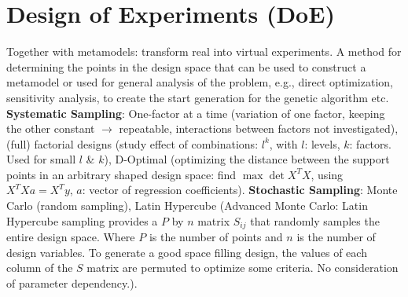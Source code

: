 \section*{Design of Experiments (DoE)}
Together with metamodels: transform real into virtual experiments.
A method for determining the points in the design space that can be used to construct a metamodel or used for general analysis of the problem, e.g., direct optimization, sensitivity analysis, to create the start
generation for the genetic algorithm etc.
\textbf{Systematic Sampling}: One-factor at a time (variation of one factor, keeping the other constant $\rightarrow$ repeatable, interactions between factors not investigated), (full) factorial designs (study effect of combinations: $l^k$, with $l$: levels, $k$: factors. Used for small $l$ \& $k$), D-Optimal (optimizing the distance between the support points in an arbitrary shaped design space: find $\max{\det{X^T X}}$, using $X^T X a = X^T y$, $a$: vector of regression coefficients).
\textbf{Stochastic Sampling}: Monte Carlo (random sampling), Latin Hypercube (Advanced Monte Carlo: Latin Hypercube sampling provides a $P$ by $n$ matrix $S_{ij}$ that randomly samples the entire design space. Where $P$ is the number of points and $n$ is the number of design variables. To generate a good space filling design, the values of each column of the $S$ matrix are permuted to optimize some criteria. No consideration of parameter dependency.).
